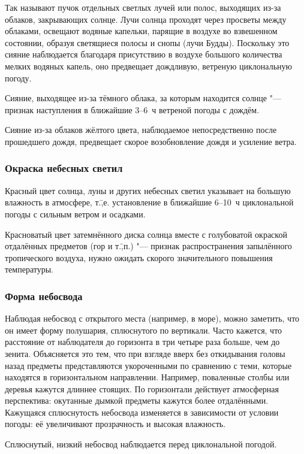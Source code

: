 Так называют пучок отдельных светлых лучей или полос, выходящих из-за
облаков, закрывающих солнце. Лучи солнца проходят через просветы между
облаками, освещают водяные капельки, парящие в воздухе во взвешенном
состоянии, образуя светящиеся полосы и снопы (лучи Будды). Поскольку
это сияние наблюдается благодаря присутствию в воздухе большого
количества мелких водяных капель, оно предвещает дождливую, ветреную
циклональную погоду.

 Сияние, выходящее из-за тёмного облака, за которым находится
солнце "--- признак наступления в ближайшие 3--6~ч ветреной погоды с
дождём.

 Сияние из-за облаков жёлтого цвета, наблюдаемое
непосредственно после прошедшего дождя, предвещает скорое
возобновление дождя и усиление ветра.

\subsubsection{Окраска небесных светил}

 Красный цвет солнца, луны и других небесных светил указывает
на большую влажность в атмосфере, т.\=,е. установление в ближайшие
6--10~ч циклональной погоды с сильным ветром и осадками.

 Красноватый цвет затемнённого диска солнца вместе с
голубоватой окраской отдалённых предметов (гор и т.\=,п.) "--- признак
распространения запылённого тропического воздуха, нужно ожидать
скорого значительного повышения температуры.

\subsubsection{Форма небосвода}

Наблюдая небосвод с открытого места (например, в море), можно
заметить, что он имеет форму полушария, сплюснутого по
вертикали. Часто кажется, что расстояние от наблюдателя до горизонта в
три четыре раза больше, чем до зенита. Объясняется это тем, что при
взгляде вверх без откидывания головы назад предметы представляются
укороченными по сравнению с теми, которые находятся в горизонтальном
направлении.  Например, поваленные столбы или деревья кажутся длиннее
стоящих. По горизонтали действует атмосферная перспектива: окутанные
дымкой предметы кажутся более отдалёнными. Кажущаяся сплюснутость
небосвода изменяется в зависимости от условии погоды: её увеличивают
прозрачность и высокая влажность.

 Сплюснутый, низкий небосвод наблюдается перед циклональной
погодой.

